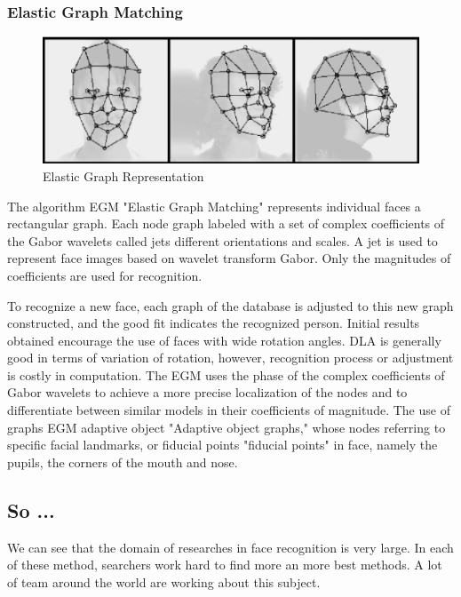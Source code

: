 \subsubsection{Elastic Graph Matching}
	\begin{figure}[h]
	\includegraphics[width = \columnwidth]{img/egm.png}
	\caption{Elastic Graph Representation}
	\end{figure}
	The algorithm EGM "Elastic Graph Matching" represents individual faces a rectangular graph. Each node
	graph labeled with a set of complex coefficients of the Gabor wavelets
	called jets different orientations and scales. A jet is used to represent
	 face images based on wavelet transform
	Gabor. Only the magnitudes of coefficients are used for recognition.

	To recognize a new face, each graph of the database is adjusted to
	this new graph constructed, and the good fit indicates the recognized person.
	Initial results obtained encourage the use of faces with wide rotation
	angles. DLA is generally good in terms of variation of rotation, however,
	recognition process or adjustment is costly in computation.
	The EGM uses the phase of the complex coefficients of Gabor wavelets to achieve a
	more precise localization of the nodes and to differentiate between similar models in their
	coefficients of magnitude.
	The use of graphs EGM adaptive object "Adaptive object graphs," whose nodes
	referring to specific facial landmarks, or fiducial points "fiducial points" in
	face, namely the pupils, the corners of the mouth and nose.

\subsection{So ...}
We can see that the domain of researches in face recognition is very large. In each of these method, searchers work hard to find more an more best methods. A lot of team around the world are working about this subject.
	
		


